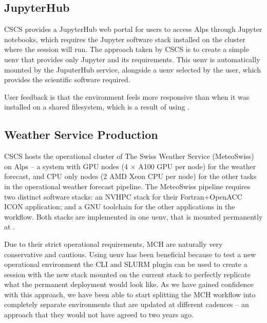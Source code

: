 \subsection{JupyterHub}

CSCS provides a JupyterHub web portal for users to access Alps through Jupyter notebooks, which requires the Jupyter software stack installed on the cluster where the session will run.
The approach taken by CSCS is to create a simple  uenv that provides only Jupyter and its requirements.
This uenv is automatically mounted by the JuputerHub service, alongside a uenv selected by the user, which provides the scientific software required.

User feedback is that the environment feels more responsive than when it was installed on a shared filesystem, which is a result of using \squashfs.

\subsection{Weather Service Production}

CSCS hosts the operational cluster of The Swiss Weather Service (MeteoSwiss) on Alps -- a system with GPU nodes (4 $\times$ A100 GPU per node) for the weather forecast, and CPU only nodes (2 AMD Xeon CPU per node) for the other tasks in the operational weather forecast pipeline.
The MeteoSwiss pipeline requires two distinct software stacks: an NVHPC stack for their Fortran+OpenACC ICON application; and a GNU toolchain for the other applications in the workflow.
Both stacks are implemented in one uenv, that is mounted permanently at .

Due to their strict operational requirements, MCH are naturally very conservative and cautious.
Using uenv has been beneficial because to test a new operational environment the CLI and SLURM plugin can be used to create a session with the new stack mounted on the current stack to perfectly replicate what the permanent deployment would look like.
As we have gained confidence with this approach, we have been able to start splitting the MCH workflow into completely separate environments that are updated at different cadences -- an approach that they would not have agreed to two years ago.


